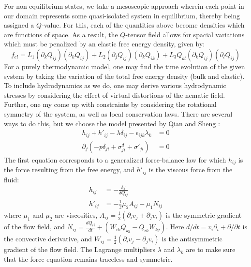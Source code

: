 \documentclass[reqno]{article}
\begin{document}
For non-equilibrium states, we take a mesoscopic approach wherein each point in
our domain represents some quasi-isolated system in equilibrium, thereby being
assigned a $Q$-value.
For this, each of the quantities above become densities which are functions of
space.
As a result, the $Q$-tensor field allows for spacial variations which must be
penalized by an elastic free energy density, given by:
\begin{equation}
  f_{el}
  =
  L_1 (\partial_k Q_{ij}) (\partial_k Q_{ij})
  + L_2 (\partial_j Q_{ij}) (\partial_k Q_{ik})
  + L_3 Q_{kl} (\partial_k Q_{ij}) (\partial_l Q_{ij})
\end{equation}
For a purely thermodynamic model, one may find the time evolution of the given
system by taking the variation of the total free energy density (bulk and
elastic).
To include hydrodynamics as we do, one may derive various hydrodynamic stresses
by considering the effect of virtual distortions of the nematic field.
Further, one my come up with constraints by considering the rotational symmetry
of the system, as well as local conservation laws.
There are several ways to do this, but we choose the model presented by Qian and
Sheng \cite{qian_generalized_1998}:
\begin{equation}
  \begin{split}
    h_{ij} + h'_{ij} - \lambda \delta_{ij} - \epsilon_{ijk} \lambda_k &= 0 \\
    \partial_j \left( -p \delta_{ji} + \sigma^d_{ji} + \sigma'_{ji} \right) &= 0
  \end{split}
\end{equation}
The first equation corresponds to a generalized force-balance law for which
$h_{ij}$ is the force resulting from the free energy, and $h'_{ij}$ is the
viscous force from the fluid:
\begin{equation}
  \begin{split}
    h_{ij} &= -\frac{\delta f}{\delta Q_{ij}} \\
    h'_{ij} &= -\frac12 \mu_2 A_{ij} - \mu_1 N_{ij}
  \end{split}
\end{equation}
where $\mu_1$ and $\mu_2$ are viscosities, $A_{ij} = \frac12 (\partial_i v_j +
\partial_j v_i)$ is the symmetric gradient of the flow field, and $N_{ij} =
\frac{d Q_{ij}}{dt} + (W_{ik} Q_{kj} - Q_{ik} W_{kj})$.
Here $d/dt = v_i \partial_i + \partial / \partial t$ is the convective
derivative, and $W_{ij} = \frac12(\partial_i v_j - \partial_j v_i)$ is the
antisymmetric gradient of the flow field.
The Lagrange multipliers $\lambda$ and $\lambda_k$ are to make sure that the
force equation remains traceless and symmetric.
\end{document}

